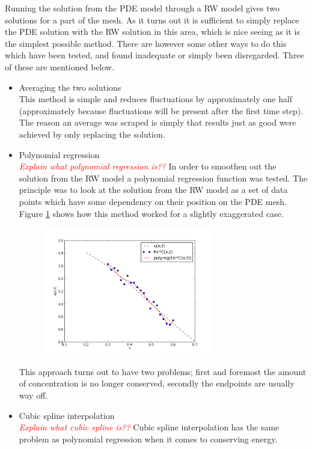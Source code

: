Running the solution from the PDE model through a RW model gives two solutions for a part of the mesh. 
As it turns out it is sufficient to simply replace the PDE solution with the RW solution in this area, which is nice seeing as it is the simplest possible method. 
There are however some other ways to do this which have been tested, and found inadequate or simply been disregarded. Three of these are mentioned below. 
\begin{itemize}
 \item Averaging the two solutions \\
 This method is simple and reduces fluctuations by approximately one half (approximately because fluctuations will be present after the first time step). 
 The reason an average was scraped is simply that results just as good were achieved by only replacing the solution.
 \item Polynomial regression \\
 \emph{\textcolor{red}{Explain what polynomial regression is??}}
 In order to smoothen out the solution from the RW model a polynomial regression function was tested. 
 The principle was to look at the solution from the RW model as a set of data points which have some dependency on their position on the PDE mesh. 
 Figure \ref{theory:polyreg} shows how this method worked for a slightly exaggerated case. 
 \begin{figure}[H]
 \centering
 \includegraphics[width=0.7\textwidth]{Figures/polyreg.png}
 \caption{}
 \label{theory:polyreg}
 \end{figure}
 This approach turns out to have two problems; first and foremost the amount of concentration is no longer conserved, secondly the endpoints are usually way off.
 \item Cubic spline interpolation \\
 \emph{\textcolor{red}{Explain what cubic spline is??}} 
 Cubic spline interpolation has the same problem as polynomial regression when it comes to conserving energy.
\end{itemize}